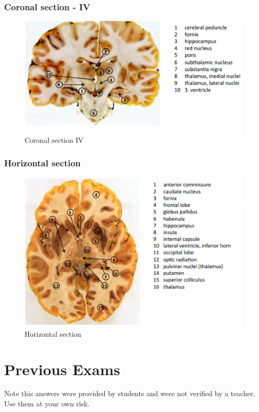 \documentclass[12pt,article,oneside,a4paper]{memoir}
\begin{document}
\subsubsection{Coronal section - IV}
\begin{figure}[H]
	\centering
  	\includegraphics[width=\linewidth]{imgs/coronal-section-IV-answer.png}
	\caption{Coronal section IV}
  	\label{fig:coronalSectionI}
\end{figure}

\subsubsection{Horizontal section}
\begin{figure}[H]
	\centering
  	\includegraphics[width=\linewidth]{imgs/horizontal-section-answer.png}
	\caption{Horizontal section}
  	\label{fig:coronalSectionI}
\end{figure}

\newpage
\section{Previous Exams}
Note this answers were provided by students and were not verified by a teacher. Use them at your own risk.
\end{document}
